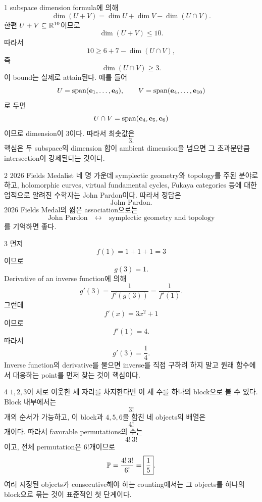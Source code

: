 \documentclass[11pt,oneside]{article}
\begin{document}

\begin{problemsolution}{1}
subspace dimension formula에 의해
\[
    \dim(U+V)
    =\dim U+\dim V-\dim(U\cap V).
\]
한편 $U+V\subseteq\mathbb{R}^{10}$이므로
\[
    \dim(U+V)\leq10.
\]
따라서
\[
    10
    \geq6+7-\dim(U\cap V),
\]
즉
\[
    \dim(U\cap V)\geq3.
\]
이 bound는 실제로 attain된다. 예를 들어
\[
    U=\operatorname{span}(\mathbf e_1,\ldots,\mathbf e_6),
    \qquad
    V=\operatorname{span}(\mathbf e_4,\ldots,\mathbf e_{10})
\]
로 두면
\[
    U\cap V=\operatorname{span}(\mathbf e_4,\mathbf e_5,\mathbf e_6)
\]
이므로 dimension이 $3$이다. 따라서 최솟값은
\[
    \boxed{3}.
\]
핵심은 두 subspace의 dimension 합이 ambient dimension을 넘으면 그 초과분만큼 intersection이 강제된다는 것이다.
\end{problemsolution}

\begin{problemsolution}{2}
2026 Fields Medalist 네 명 가운데 symplectic geometry와 topology를 주된 분야로 하고, holomorphic curves, virtual fundamental cycles, Fukaya categories 등에 대한 업적으로 알려진 수학자는 John Pardon이다. 따라서 정답은
\[
    \boxed{\text{John Pardon}}.
\]
2026 Fields Medal의 짧은 association으로는
\[
    \text{John Pardon}
    \quad\longleftrightarrow\quad
    \text{symplectic geometry and topology}
\]
를 기억하면 좋다.
\end{problemsolution}

\begin{problemsolution}{3}
먼저
\[
    f(1)=1+1+1=3
\]
이므로
\[
    g(3)=1.
\]
Derivative of an inverse function에 의해
\[
    g'(3)
    =\frac{1}{f'(g(3))}
    =\frac{1}{f'(1)}.
\]
그런데
\[
    f'(x)=3x^2+1
\]
이므로
\[
    f'(1)=4.
\]
따라서
\[
    \boxed{g'(3)=\frac14}.
\]
Inverse function의 derivative를 물으면 inverse를 직접 구하려 하지 말고 원래 함수에서 대응하는 point를 먼저 찾는 것이 핵심이다.
\end{problemsolution}

\begin{problemsolution}{4}
$1,2,3$이 서로 이웃한 세 자리를 차지한다면 이 세 수를 하나의 block으로 볼 수 있다. Block 내부에서는
\[
    3!
\]
개의 순서가 가능하고, 이 block과 $4,5,6$을 합친 네 objects의 배열은
\[
    4!
\]
개이다. 따라서 favorable permutations의 수는
\[
    4!\,3!
\]
이고, 전체 permutation은 $6!$개이므로
\[
    \mathbb{P}
    =\frac{4!\,3!}{6!}
    =\boxed{\frac15}.
\]
여러 지정된 objects가 consecutive해야 하는 counting에서는 그 objects를 하나의 block으로 묶는 것이 표준적인 첫 단계이다.
\end{problemsolution}
\end{document}
